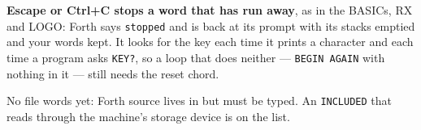 \textbf{Escape or Ctrl+C stops a word that has run away}, as in the
BASICs, RX and LOGO: Forth says \texttt{stopped} and is back at its prompt
with its stacks emptied and your words kept. It looks for the key each
time it prints a character and each time a program asks \verb|KEY?|, so a
loop that does neither --- \verb|BEGIN AGAIN| with nothing in it --- still
needs the reset chord.

\begin{aside}
No file words yet: Forth source lives in  but must be
typed.
An \texttt{INCLUDED} that reads through the machine's storage device is on
the list.
\end{aside}
